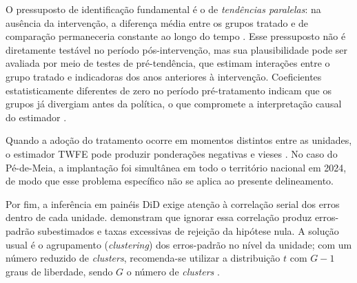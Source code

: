 O pressuposto de identificação fundamental é o de \textit{tendências paralelas}: na ausência da intervenção, a diferença média entre os grupos tratado e de comparação permaneceria constante ao longo do tempo \cite{Roth2023}.
Esse pressuposto não é diretamente testável no período pós-intervenção, mas sua plausibilidade pode ser avaliada por meio de testes de pré-tendência, que estimam interações entre o grupo tratado e indicadoras dos anos anteriores à intervenção.
Coeficientes estatisticamente diferentes de zero no período pré-tratamento indicam que os grupos já divergiam antes da política, o que compromete a interpretação causal do estimador \cite{Roth2023,Rambachan2023}.

Quando a adoção do tratamento ocorre em momentos distintos entre as unidades, o estimador TWFE pode produzir ponderações negativas e vieses \cite{GoodmanBacon2021,Callaway2021}.
No caso do Pé-de-Meia, a implantação foi simultânea em todo o território nacional em 2024, de modo que esse problema específico não se aplica ao presente delineamento.

Por fim, a inferência em painéis DiD exige atenção à correlação serial dos erros dentro de cada unidade.
 demonstram que ignorar essa correlação produz erros-padrão subestimados e taxas excessivas de rejeição da hipótese nula.
A solução usual é o agrupamento (\textit{clustering}) dos erros-padrão no nível da unidade; com um número reduzido de \textit{clusters}, recomenda-se utilizar a distribuição $t$ com $G-1$ graus de liberdade, sendo $G$ o número de \textit{clusters} \cite{Cameron2015}.
